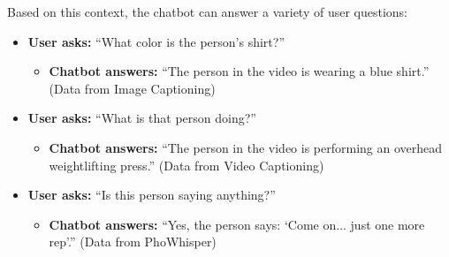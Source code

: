 \noindent
Based on this context, the chatbot can answer a variety of user questions:

\begin{itemize}
    \item \textbf{User asks:} ``What color is the person's shirt?''
    \begin{itemize}
        \item \textbf{Chatbot answers:} ``The person in the video is wearing a blue shirt.'' (Data from Image Captioning)
    \end{itemize}

    \item \textbf{User asks:} ``What is that person doing?''
    \begin{itemize}
        \item \textbf{Chatbot answers:} ``The person in the video is performing an overhead weightlifting press.'' (Data from Video Captioning)
    \end{itemize}

    \item \textbf{User asks:} ``Is this person saying anything?''
    \begin{itemize}
        \item \textbf{Chatbot answers:} ``Yes, the person says: `Come on... just one more rep'.'' (Data from PhoWhisper)
    \end{itemize}
\end{itemize}